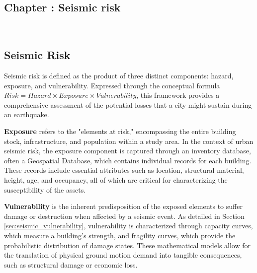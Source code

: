 \graphicspath{
    {figures_and_references/EELISA_conference/}
}

\renewcommand{\chapternametext}{Chapter \thechapter: Seismic risk}

\begin{refsection}

\chapter{\chapternametext}
\

\renewcommand{\headingtextL}{}
\renewcommand{\headingtextR}{\chapternametext}
\begingroup
 \flushbottom
 \setlength{\parskip}{0pt plus 1fil}%
 \localtableofcontents 
\endgroup

\begingroup
 \flushbottom
 \setlength{\parskip}{0pt plus 1fil}%
 \locallistoffigures
 \locallistoftables
\endgroup


\newpage

\setcounter{section}{0} 



\FloatBarrier

\renewcommand{\sectionnametext}{Seismic Risk}
\renewcommand{\headingtextL}{\chapternametext}
\renewcommand{\headingtextR}{\thesection. \sectionnametext}
\section{\sectionnametext}

Seismic risk is defined as the product of three distinct components: hazard, exposure, and vulnerability. Expressed through the conceptual formula $Risk = Hazard \times Exposure \times Vulnerability$, this framework provides a comprehensive assessment of the potential losses that a city might sustain during an earthquake.

\textbf{Exposure} refers to the "elements at risk," encompassing the entire building stock, infrastructure, and population within a study area. In the context of urban seismic risk, the exposure component is captured through an inventory database, often a Geospatial Database, which contains individual records for each building. These records include essential attributes such as location, structural material, height, age, and occupancy, all of which are critical for characterizing the susceptibility of the assets.

\textbf{Vulnerability} is the inherent predisposition of the exposed elements to suffer damage or destruction when affected by a seismic event. As detailed in Section \ref{sec:seismic_vulnerability}, vulnerability is characterized through capacity curves, which measure a building's strength, and fragility curves, which provide the probabilistic distribution of damage states. These mathematical models allow for the translation of physical ground motion demand into tangible consequences, such as structural damage or economic loss.


\end{refsection}
